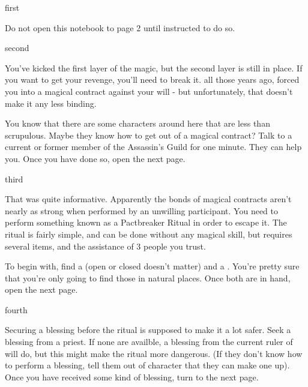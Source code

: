 \documentclass[greennotebook]{NeptuneBall}
\begin{document}

\startnotebook{\nSpellBreakNotebook{}}

\begin{page}{first}

Do not open this notebook to page 2 until instructed to do so.


\end{page}

\begin{page}{second}

You've kicked the first layer of the magic, but the second layer is still in place. If you want to get your revenge, you'll need to break it. all those years ago, \cWitch{} forced you into a magical contract against your will - but unfortunately, that doesn't make it any less binding.

You know that there are some characters around here that are less than scrupulous. Maybe they know how to get out of a magical contract? Talk to a current or former member of the Assassin's Guild for one minute. They can help you. Once you have done so, open the next page.

\end{page}

\begin{page}{third}

That was quite informative. Apparently the bonds of magical contracts aren't nearly as strong when performed by an unwilling participant. You need to perform something known as a Pactbreaker Ritual in order to escape it. The ritual is fairly simple, and can be done without any magical skill, but requires several items, and the assistance of 3 people you trust.

To begin with, find a \iClam{} (open or closed doesn't matter) and a \iSeaFan{}. You're pretty sure that you're only going to find those in natural places. Once both are in hand, open the next page.

\end{page}

\begin{page}{fourth}

Securing a blessing before the ritual is supposed to make it a lot safer. Seek a blessing from a priest. If none are availble, a blessing from the current ruler of \pAtlantis{} will do, but this might make the ritual more dangerous. (If they don't know how to perform a blessing, tell them out of character that they can make one up). Once you have received some kind of blessing, turn to the next page.

\end{page}
\end{document}
